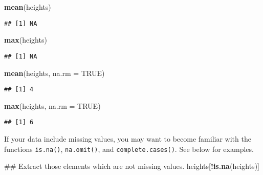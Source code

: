 \documentclass[]{book}
\newenvironment{Shaded}{\begin{snugshade}}{\end{snugshade}}
\newcommand{\KeywordTok}[1]{\textcolor[rgb]{0.13,0.29,0.53}{\textbf{#1}}}
\newcommand{\DataTypeTok}[1]{\textcolor[rgb]{0.13,0.29,0.53}{#1}}
\newcommand{\OtherTok}[1]{\textcolor[rgb]{0.56,0.35,0.01}{#1}}
\newcommand{\OperatorTok}[1]{\textcolor[rgb]{0.81,0.36,0.00}{\textbf{#1}}}
\newcommand{\NormalTok}[1]{#1}
\begin{document}
\begin{Shaded}
\begin{Highlighting}[]
\KeywordTok{mean}\NormalTok{(heights)}
\end{Highlighting}
\end{Shaded}

\begin{verbatim}
## [1] NA
\end{verbatim}

\begin{Shaded}
\begin{Highlighting}[]
\KeywordTok{max}\NormalTok{(heights)}
\end{Highlighting}
\end{Shaded}

\begin{verbatim}
## [1] NA
\end{verbatim}

\begin{Shaded}
\begin{Highlighting}[]
\KeywordTok{mean}\NormalTok{(heights, }\DataTypeTok{na.rm =} \OtherTok{TRUE}\NormalTok{)}
\end{Highlighting}
\end{Shaded}

\begin{verbatim}
## [1] 4
\end{verbatim}

\begin{Shaded}
\begin{Highlighting}[]
\KeywordTok{max}\NormalTok{(heights, }\DataTypeTok{na.rm =} \OtherTok{TRUE}\NormalTok{)}
\end{Highlighting}
\end{Shaded}

\begin{verbatim}
## [1] 6
\end{verbatim}

If your data include missing values, you may want to become familiar
with the functions \texttt{is.na()}, \texttt{na.omit()}, and
\texttt{complete.cases()}. See below for examples.

\begin{Shaded}
\begin{Highlighting}[]
\NormalTok{## Extract those elements which are not missing values.}
\NormalTok{heights[}\OperatorTok{!}\KeywordTok{is.na}\NormalTok{(heights)]}
\end{Highlighting}
\end{Shaded}
\end{document}
